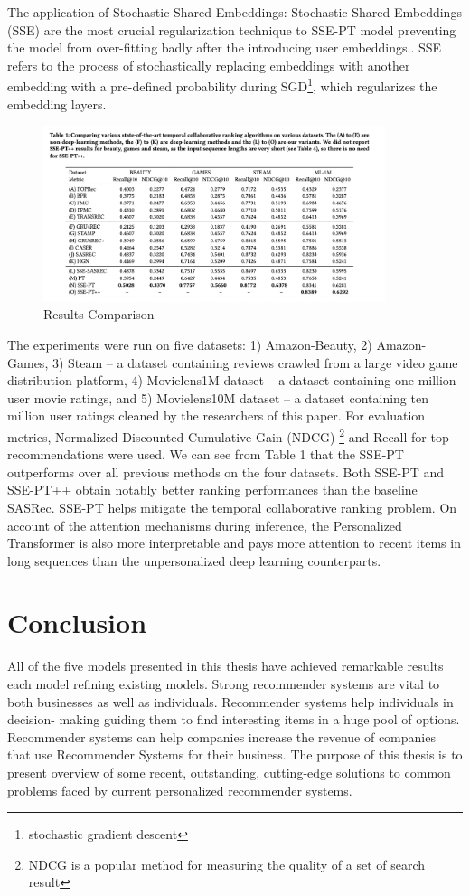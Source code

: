 The application of Stochastic Shared Embeddings: Stochastic Shared Embeddings (SSE) are the most crucial regularization technique to SSE-PT model preventing the model from over-fitting badly after the introducing user embeddings.. SSE refers to the process of 
stochastically replacing embeddings with another embedding with
a pre-defined probability during SGD\footnote{stochastic gradient descent}, which regularizes the embedding layers. 
\begin{figure}[ht!]
    \centering
    \includegraphics[width=100mm]{results_Transformer.png}
    \caption{Results Comparison
    \label{overflow}}
\end{figure}
The experiments were run on five datasets: 1) Amazon-Beauty, 2) Amazon-Games, 3) Steam -- a dataset containing reviews crawled from a large video game distribution platform, 4) Movielens1M dataset -- a dataset containing one million user movie ratings, and 5) Movielens10M dataset -- a dataset containing ten million user ratings cleaned by the researchers of this paper. For evaluation metrics, Normalized Discounted Cumulative Gain (NDCG) \footnote{NDCG is a popular method for measuring the quality of a set of search result} and Recall for top recommendations were used.   We can see from Table 1 that the SSE-PT outperforms over all previous methods on the four datasets. Both SSE-PT and SSE-PT++ obtain notably better ranking performances than the baseline SASRec.
SSE-PT helps mitigate the temporal collaborative ranking
problem. On account of the attention mechanisms
during inference, the Personalized Transformer is also more interpretable and pays more attention to recent items in long sequences than the unpersonalized deep learning counterparts.

\chapter{ Conclusion}

All of the five models presented in this thesis have achieved remarkable results each model refining existing models. Strong recommender systems are vital to both businesses as well as individuals. Recommender systems help individuals in decision- making guiding them to find interesting items in a huge pool of options. Recommender systems can help companies increase the revenue of companies that use Recommender Systems for their business. The purpose of this thesis is to present overview of some recent, outstanding, cutting-edge solutions to common problems faced by current personalized recommender systems.

